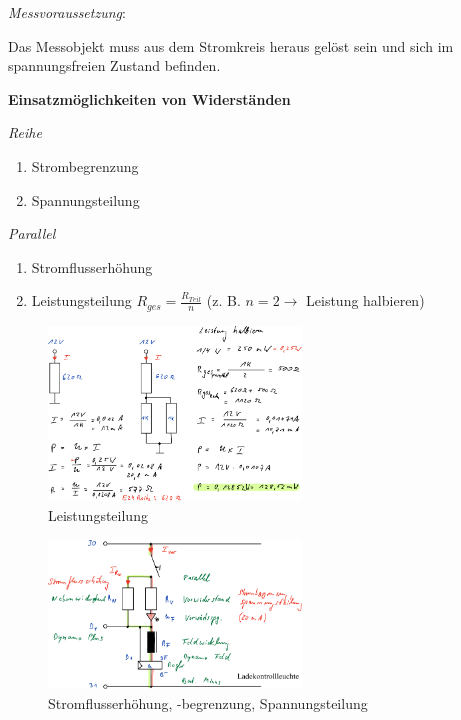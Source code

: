 \emph{Messvoraussetzung}:

Das Messobjekt muss aus dem Stromkreis heraus gelöst sein und sich im
spannungsfreien Zustand befinden.

\textbf{Einsatzmöglichkeiten von Widerständen}

\emph{Reihe}

\begin{enumerate}
\def\labelenumi{(\arabic{enumi})}
\item
  Strombegrenzung
\item
  Spannungsteilung
\end{enumerate}

\emph{Parallel}

\begin{enumerate}
\def\labelenumi{(\arabic{enumi})}
\item
  Stromflusserhöhung
\item
  Leistungsteilung $\boxed{R_{ges} = \frac{R_{Teil}}{n}}$ (z. B.
  $n = 2 \to$ Leistung halbieren)
\end{enumerate}

\begin{figure}[!ht]%
\centering
\includegraphics[width=0.6\textwidth]{images/Skizze/17_Leistungsteilung_Skizze.pdf}
\caption{Leistungsteilung}
\end{figure}

\begin{figure}[!ht]%
\centering
\includegraphics[width=0.6\textwidth]{images/Skizze/18_Stromflusserhoehung_Strombegrenzung_Spannungsteilung_Skizze.pdf}
\caption{Stromflusserhöhung, -begrenzung, Spannungsteilung}
\end{figure}

